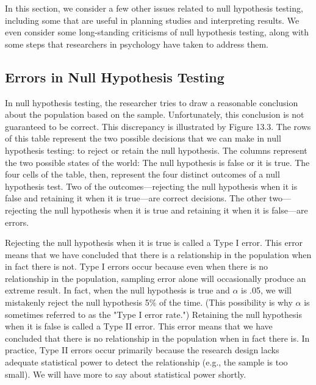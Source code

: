 In this section, we consider a few other issues related to null hypothesis testing, including some that are useful in planning studies and interpreting results. We even consider some long-standing criticisms of null hypothesis testing, along with some steps that researchers in psychology have taken to address them.


\subsection{Errors in Null Hypothesis Testing}


In null hypothesis testing, the researcher tries to draw a reasonable conclusion about the population based on the sample. Unfortunately, this conclusion is not guaranteed to be correct. This discrepancy is illustrated by Figure 13.3. The rows of this table represent the two possible decisions that we can make in null hypothesis testing: to reject or retain the null hypothesis. The columns represent the two possible states of the world: The null hypothesis is false or it is true. The four cells of the table, then, represent the four distinct outcomes of a null hypothesis test. Two of the outcomes---rejecting the null hypothesis when it is false and retaining it when it is true---are correct decisions. The other two---rejecting the null hypothesis when it is true and retaining it when it is false---are errors.


Rejecting the null hypothesis when it is true is called a Type I error. This error means that we have concluded that there is a relationship in the population when in fact there is not. Type I errors occur because even when there is no relationship in the population, sampling error alone will occasionally produce an extreme result. In fact, when the null hypothesis is true and $\alpha$ is .05, we will mistakenly reject the null hypothesis 5\% of the time. (This possibility is why $\alpha$ is sometimes referred to as the "Type I error rate.") Retaining the null hypothesis when it is false is called a Type II error. This error means that we have concluded that there is no relationship in the population when in fact there is. In practice, Type II errors occur primarily because the research design lacks adequate statistical power to detect the relationship (e.g., the sample is too small). We will have more to say about statistical power shortly.


